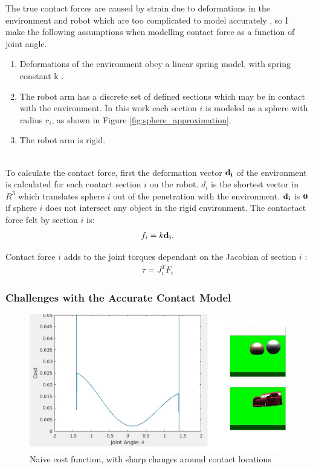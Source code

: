 \documentclass[../thesis.tex]{subfiles}
\begin{document}
The true contact forces are caused by strain due to deformations in the environment and robot which are too complicated to model accurately \cite{Saund2013}, so I make the following assumptions when modelling contact force as a function of joint angle.
\begin{enumerate}
\item Deformations of the environment obey a linear spring model, with spring constant k \cite{blandford2003applications}.
\item The robot arm has a discrete set of defined sections which may be in contact with the environment. In this work each section $i$ is modeled as a sphere with radius $r_i$, as shown in Figure \ref{fig:sphere_approximation}.
\item The robot arm is rigid.
\end{enumerate}\\



To calculate the contact force, first the deformation vector ${\bf d_i}$ of the environment is calculated for each contact section $i$ on the robot.
$d_i$ is the shortest vector in $R^3$ which translates sphere $i$ out of the penetration with the environment.
${\bf d_i}$ is ${\bf 0}$ if sphere $i$ does not intersect any object in the rigid environment.
The contactact force felt by section $i$ is:
\begin{align}
  f_i = k {\bf d_i}.
\end{align}

Contact force $i$ adds to the joint torques dependant on the Jacobian of section $i$ \cite{murray1994mathematical}:
\begin{align}
  \tau = J_{i}^T F_i
\end{align}



\subsubsection{Challenges with the Accurate Contact Model}
\begin{figure}
  \centering
  \includegraphics[width=\linewidth]{./Planning/naive_cost}
  \caption{Naive cost function, with sharp changes around contact locations}
  \label{fig:naive_cost}
\end{figure}
\end{document}
